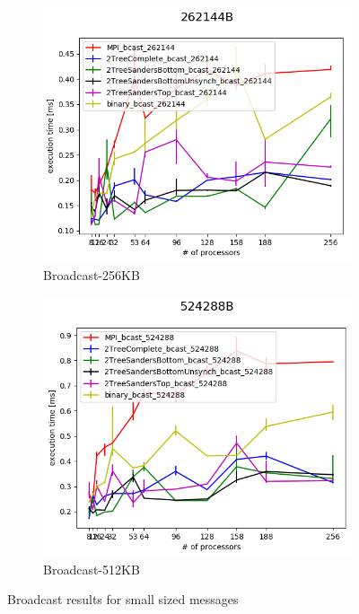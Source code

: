 \documentclass[sigplan,review,anonymous]{acmart}\settopmatter{printfolios=true,printccs=false,printacmref=false}
\begin{document}
\begin{figure}
\centering
\begin{subfigure}{.25\textwidth}
  \centering
  \includegraphics[width=1\linewidth]{images/Results/bcast_comp_262144B.png}
  \caption{Broadcast-256KB}
  \label{bcast-selected-256B}
\end{subfigure}%
\begin{subfigure}{.25\textwidth}
  \centering
  \includegraphics[width=1\linewidth]{images/Results/bcast_comp_524288B.png}
  \caption{Broadcast-512KB}
  \label{bcast-selected-512B}
\end{subfigure}
\caption{Broadcast results for small sized messages}
\label{graph-bcast-small-selected}
\end{figure}
\end{document}
